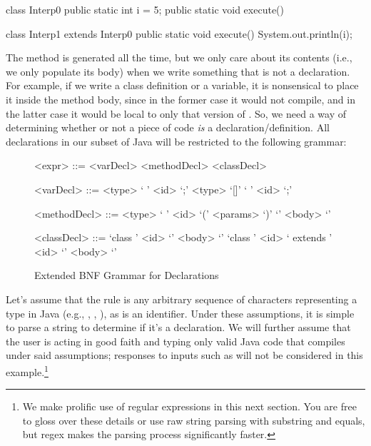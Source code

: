 \begin{verbnobox}[\small]
class Interp0 {
  public static int i = 5;
  public static void execute() {}
}

class Interp1 extends Interp0 {
  public static void execute() {
    System.out.println(i);  
  }
}
\end{verbnobox}

The  method is generated all the time, but we only care about its contents (i.e., we only populate its body) when we write something that is not a declaration. For example, if we write a class definition or a variable, it is nonsensical to place it inside the  method body, since in the former case it would not compile, and in the latter case it would be local to only that version of . So, we need a way of determining whether or not a piece of code \emph{is} a declaration/definition. All declarations in our subset of Java will be restricted to the following grammar:

\setlength{\grammarparsep}{20pt plus 1pt minus 1pt} %
\setlength{\grammarindent}{12em} %
\begin{figure}[H]
        \begin{grammar}
            <expr> ::= <varDecl> 
                    \alt <methodDecl> 
                    \alt <classDecl>

            <varDecl> ::= <type> ` ' <id> `;'
                      \alt <type> `[]' ` ' <id> `;'

            <methodDecl> ::= <type> ` ' <id> `(' <params> `)' `{' <body> `}'

            <classDecl> ::= `class ' <id> `{' <body> `}'
                        \alt `class ' <id> ` extends ' <id> `{' <body> `}'

        \end{grammar}
    \caption{ Extended BNF Grammar for Declarations }
\end{figure}

Let's assume that the  rule is any arbitrary sequence of characters representing a type in Java (e.g., , , ), as is an identifier. Under these assumptions, it is simple to parse a string to determine if it's a declaration. We will further assume that the user is acting in good faith and typing only valid Java code that compiles under said assumptions; responses to inputs such as  will not be considered in this example.\footnote{We make prolific use of regular expressions in this next section. You are free to gloss over these details or use raw string parsing with substring and equals, but regex makes the parsing process significantly faster.}

